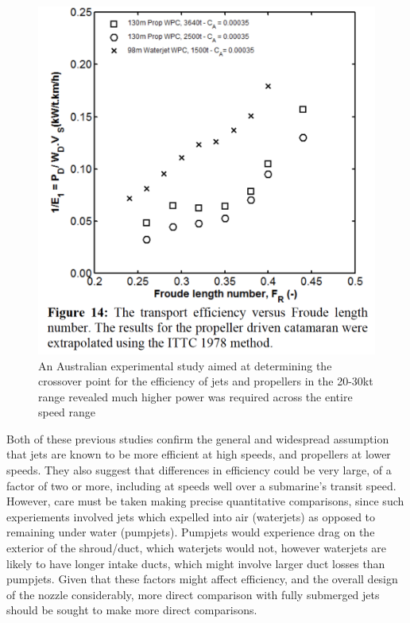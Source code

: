 \documentclass{article}\usepackage[]{graphicx}\usepackage[]{color}
\begin{document}
\begin{figure}
\includegraphics[width=\textwidth]{EfficiencyTransport.png}
\caption{An Australian experimental study aimed at determining the crossover point for the efficiency of jets and propellers in the 20-30kt range revealed much higher power was required across the entire speed range \parencite{kamal2015}}
\label{fig:EfficiencyTransport.png}
\end{figure}

Both of these previous studies confirm the general and widespread assumption that jets are known to be more efficient at high speeds, and propellers at lower speeds.  They also suggest that differences in efficiency could be very large, of a factor of two or more, including at speeds well over a submarine's transit speed.  However, care must be taken making precise quantitative comparisons, since such experiements involved jets which expelled into air (waterjets) as opposed to remaining under water (pumpjets). Pumpjets would experience drag on the exterior of the shroud/duct, which waterjets would not, however waterjets are likely to have longer intake ducts, which might involve larger duct losses than pumpjets.  Given that these factors might affect efficiency, and the overall design of the nozzle considerably, more direct comparison with fully submerged jets should be sought to make more direct comparisons.
\end{document}
